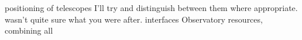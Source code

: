 \documentclass[times]{cpeauth}
\begin{document}
%
%
%
positioning of telescopes
%
%
I'll try and distinguish between them where appropriate.
%
wasn't quite sure what you were after.
%
%
interfaces %
Observatory %
resources, %
combining all %
%
%
\end{document}
